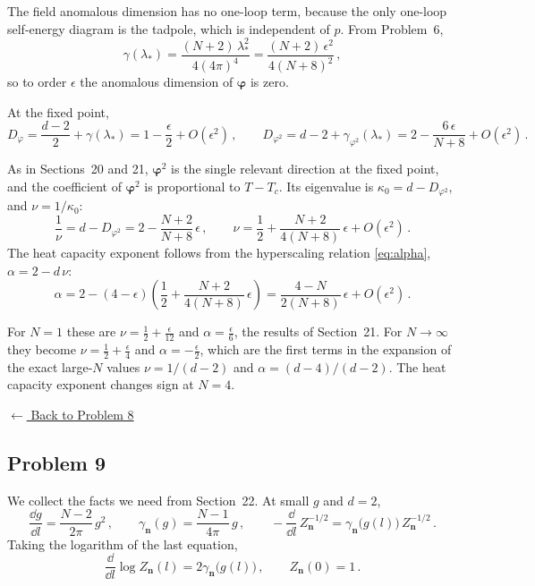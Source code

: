  The field anomalous dimension has
no one-loop term, because the only one-loop self-energy diagram is the
tadpole, which is independent of $p$. From Problem~6,
\[
\gamma(\lambda_*)=\frac{(N+2)\,\lambda_*^2}{4(4\pi)^4}=\frac{(N+2)\,\epsilon^2}{4(N+8)^2}\,,
\]
so to order $\epsilon$ the anomalous dimension of $\bm{\varphi}$ is zero.

 At the fixed point,
\[
D_\varphi=\frac{d-2}2+\gamma(\lambda_*)=1-\frac\epsilon2+O(\epsilon^2)\,,\qquad
D_{\varphi^2}=d-2+\gamma_{\varphi^2}(\lambda_*)=2-\frac{6\,\epsilon}{N+8}+O(\epsilon^2)\,.
\]

 As in Sections~20 and 21, $\bm{\varphi}^2$ is the single
relevant direction at the fixed point, and the coefficient of $\bm{\varphi}^2$ is
proportional to $T-T_c$. Its eigenvalue is $\kappa_0=d-D_{\varphi^2}$, and
$\nu=1/\kappa_0$:
\[
\frac1\nu=d-D_{\varphi^2}=2-\frac{N+2}{N+8}\,\epsilon\,,\qquad
\nu=\frac12+\frac{N+2}{4(N+8)}\,\epsilon+O(\epsilon^2)\,.
\]
The heat capacity exponent follows from the hyperscaling relation
\eqref{eq:alpha}, $\alpha=2-d\,\nu$:
\[
\alpha=2-(4-\epsilon)\left(\frac12+\frac{N+2}{4(N+8)}\,\epsilon\right)
=\frac{4-N}{2(N+8)}\,\epsilon+O(\epsilon^2)\,.
\]

 For $N=1$ these are $\nu=\frac12+\frac\epsilon{12}$ and
$\alpha=\frac\epsilon6$, the results of Section~21. For $N\to\infty$ they become
$\nu=\frac12+\frac\epsilon4$ and $\alpha=-\frac\epsilon2$, which are the first
terms in the expansion of the exact large-$N$ values $\nu=1/(d-2)$ and
$\alpha=(d-4)/(d-2)$. The heat capacity exponent changes sign at $N=4$.

\noindent\hyperref[hw:8]{$\leftarrow$ Back to Problem 8}

\subsection{Problem 9}\label{sol:9}

We collect the facts we need from Section~22. At small $g$ and $d=2$,
\[
\frac{\dd g}{\dd l}=\frac{N-2}{2\pi}\,g^2\,,\qquad
\gamma_{\mathbf n}(g)=\frac{N-1}{4\pi}\,g\,,\qquad
-\frac{\dd}{\dd l}\,Z_{\mathbf n}^{-1/2}=\gamma_{\mathbf n}\bigl(g(l)\bigr)\,Z_{\mathbf n}^{-1/2}\,.
\]
Taking the logarithm of the last equation,
\[
\frac{\dd}{\dd l}\log Z_{\mathbf n}(l)=2\gamma_{\mathbf n}\bigl(g(l)\bigr)\,,\qquad Z_{\mathbf n}(0)=1\,.
\]

